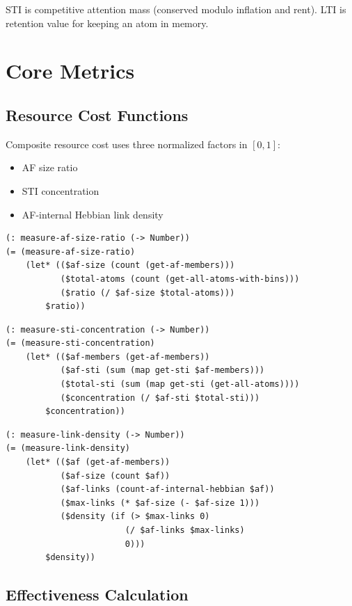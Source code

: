 \documentclass[11pt]{article}
\theoremstyle{definition}
\begin{document}
STI is competitive attention mass (conserved modulo inflation and rent). LTI is retention value for keeping an atom in memory.

\section{Core Metrics}\label{sec:minimal}

\subsection{Resource Cost Functions}

Composite resource cost uses three normalized factors in $[0,1]$:
\begin{itemize}
    \item AF size ratio
    \item STI concentration
    \item AF-internal Hebbian link density
\end{itemize}

\begin{lstlisting}[style=metta, caption=Ratio]
(: measure-af-size-ratio (-> Number))
(= (measure-af-size-ratio)
    (let* (($af-size (count (get-af-members)))
           ($total-atoms (count (get-all-atoms-with-bins)))
           ($ratio (/ $af-size $total-atoms)))
        $ratio))
\end{lstlisting}

\clearpage
\begin{lstlisting}[style=metta, caption=Concentration]
(: measure-sti-concentration (-> Number))
(= (measure-sti-concentration)
    (let* (($af-members (get-af-members))
           ($af-sti (sum (map get-sti $af-members)))
           ($total-sti (sum (map get-sti (get-all-atoms))))
           ($concentration (/ $af-sti $total-sti)))
        $concentration))
\end{lstlisting}

\begin{lstlisting}[style=metta, caption=Density]
(: measure-link-density (-> Number))
(= (measure-link-density)
    (let* (($af (get-af-members))
           ($af-size (count $af))
           ($af-links (count-af-internal-hebbian $af))
           ($max-links (* $af-size (- $af-size 1)))
           ($density (if (> $max-links 0)
                        (/ $af-links $max-links)
                        0)))
        $density))
\end{lstlisting}

\subsection{Effectiveness Calculation}
\end{document}

